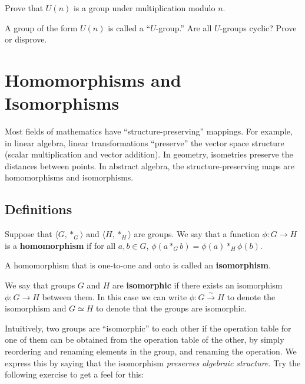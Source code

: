 \begin{problem}
    \mbox{}
\begin{problemparts}
  \item Prove that \(U(n)\) is a group under multiplication modulo \(n\).
  \item A group of the form \(U(n)\) is called a ``\(U\)-group.'' Are all \(U\)-groups cyclic? Prove or disprove.
\end{problemparts}
\end{problem}

\chapter{Homomorphisms and Isomorphisms}\label{chap:homomorphisms}
Most fields of mathematics have ``structure-preserving'' mappings. For example, in linear algebra, linear transformations ``preserve'' the vector space structure (scalar multiplication and vector addition). In geometry, isometries preserve the distances between points. In abstract algebra, the structure-preserving maps are homomorphisms and isomorphisms.

\section{Definitions}

\begin{definition}
Suppose that
\(\langle G, *_{G} \rangle \)
and \(\langle H, *_{H} \rangle \) are groups. We say that a function
\(\phi : G \longrightarrow H\) is a \textbf{homomorphism} if for all \(a, b \in G\), \(\phi(a *_{G} b) = \phi(a) *_{H} \phi(b) \).

A homomorphism that is one-to-one and onto is called an \textbf{isomorphism}.
\begin{annotation}
\end{annotation}
\end{definition}

We say that groups \(G\) and \(H\) are \textbf{isomorphic} if there exists an isomorphism \(\phi : G \longrightarrow H\) between them. In this case we can write \(\phi : G \stackrel{\sim}{\longrightarrow} H\) to denote the isomorphism and \(G \simeq H\) to denote that the groups are isomorphic.

Intuitively, two groups are ``isomorphic'' to each other if the operation table for one of them can be obtained from the operation table of the other, by simply reordering and renaming elements in the group, and renaming the operation. We express this by saying that the isomorphism \emph{preserves algebraic structure.} Try the following exercise to get a feel for this:

